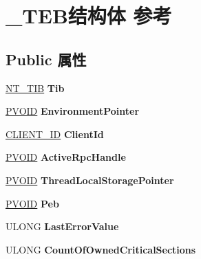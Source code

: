 \hypertarget{struct___t_e_b}{}\section{\+\_\+\+T\+E\+B结构体 参考}
\label{struct___t_e_b}
\subsection*{Public 属性}
\begin{DoxyCompactItemize}
\item 
\mbox{\label{struct___t_e_b_af446009d8e1c685022ca8f6df365bd19}} 
\hyperlink{struct___n_t___t_i_b}{N\+T\+\_\+\+T\+IB} {\bfseries Tib}
\item 
\mbox{\label{struct___t_e_b_a0b940cac7daf04639b7e56a94538dccc}} 
\hyperlink{interfacevoid}{P\+V\+O\+ID} {\bfseries Environment\+Pointer}
\item 
\mbox{\label{struct___t_e_b_ac15f84eca961393664d525a69041248e}} 
\hyperlink{struct___c_l_i_e_n_t___i_d}{C\+L\+I\+E\+N\+T\+\_\+\+ID} {\bfseries Client\+Id}
\item 
\mbox{\label{struct___t_e_b_a83a092f15556abc5b799b03a28d7d3a2}} 
\hyperlink{interfacevoid}{P\+V\+O\+ID} {\bfseries Active\+Rpc\+Handle}
\item 
\mbox{\label{struct___t_e_b_aa2164b2a0e858b22f693fa60680e9418}} 
\hyperlink{interfacevoid}{P\+V\+O\+ID} {\bfseries Thread\+Local\+Storage\+Pointer}
\item 
\mbox{\label{struct___t_e_b_a75e21b3fdbafc64943574b405efa3772}} 
\hyperlink{interfacevoid}{P\+V\+O\+ID} {\bfseries Peb}
\item 
\mbox{\label{struct___t_e_b_aee88390d3c4b09225651fee8794c8f92}} 
U\+L\+O\+NG {\bfseries Last\+Error\+Value}
\item 
\mbox{\label{struct___t_e_b_a6a81b2f97ccd3dbbcae60d772a22cff8}} 
U\+L\+O\+NG {\bfseries Count\+Of\+Owned\+Critical\+Sections}
\item 
\mbox{\label{struct___t_e_b_af8dbb116c896431cc3932b797ad3ff56}} 

\end{DoxyCompactItemize}
